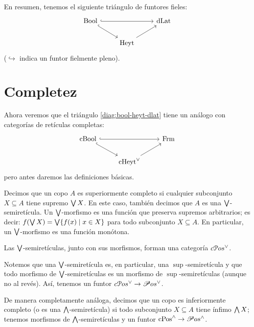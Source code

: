 En resumen, tenemos el siguiente triángulo de funtores fieles:
\begin{equation} \label{diag:bool-heyt-dlat}
\begin{tikzcd}
  \Bool \ar[dr,hook] \ar[rr,hook] &               & \DLat \\
                                  & \Heyt \ar[ur]
\end{tikzcd}
\end{equation}
($\hookrightarrow$ indica un funtor fielmente pleno).

\section{Completez}
\label{ss:completez}
Ahora veremos que el triángulo \eqref{diag:bool-heyt-dlat}
tiene un análogo con categorías de retículas completas:
\begin{equation} \label{diag:cbool-cheyt-frm}
\begin{tikzcd}
  \CBA \ar[dr,hook] \ar[rr,hook] &               & \Frm \\
                                  & \cHeyt \ar[ur]
\end{tikzcd}
\end{equation}
pero antes daremos las definiciones básicas.

\begin{defn}
  Decimos que un copo $A$ es superiormente completo
  si cualquier subconjunto $X\subseteq A$ tiene supremo $\bigvee X$.
  En este caso, también decimos que $A$ es una $\bigvee$-semiretícula.
  Un $\bigvee$-morfismo es una función que preserva supremos arbitrarios;
  es decir: $f(\bigvee X)=\bigvee\{f(x)\mid x\in X\}$
  para todo subconjunto $X\subseteq A$. En particular, un
  $\bigvee$-morfismo es una función monótona.

  Las $\bigvee$-semiretículas, junto con sus morfismos,
  forman una categoría $c\EuScript{P}os^\vee$.
\end{defn}
Notemos que una $\bigvee$-semiretícula es, en particular,
una $\sup$-semiretícula y que todo morfismo de $\bigvee$-semiretículas es
un morfismo de $\sup$-semiretículas (aunque no al revés).
Así, tenemos un funtor $c\EuScript{P}os^\vee\to\mathscr{P}os^\vee$.

De manera completamente análoga, decimos que un copo es
inferiormente completo (o es una $\bigwedge$-semiretícula)
si todo subconjunto $X\subseteq A$ tiene ínfimo $\bigwedge X$; tenemos
morfismos de $\bigwedge$-semiretículas y un funtor
$\mathrm{cPos}^\wedge\to\mathscr{P}os^{\wedge}$.

